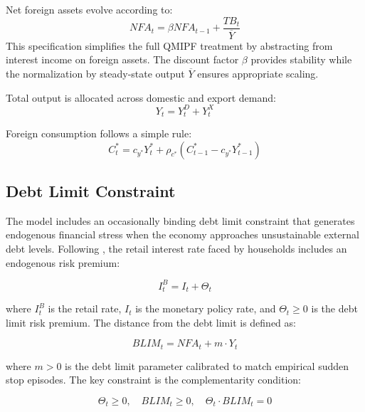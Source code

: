 \documentclass[12pt]{article}
\begin{document}
Net foreign assets evolve according to:
\begin{equation}\label{eq:nfa}
NFA_t = \beta NFA_{t-1} + \frac{TB_t}{\overline{Y}}
\end{equation}
This specification simplifies the full QMIPF treatment by abstracting from interest income on foreign assets. The discount factor $\beta$ provides stability while the normalization by steady-state output $\overline{Y}$ ensures appropriate scaling.

Total output is allocated across domestic and export demand:
\begin{equation}
Y_t = Y_t^D + Y_t^X
\end{equation}

Foreign consumption follows a simple rule:
\begin{equation}
C_t^* = c_{y^*} Y_t^* + \rho_{c^*} (C_{t-1}^* - c_{y^*} Y_{t-1}^*)
\end{equation}

\subsection{Debt Limit Constraint}\label{sec:debt_limit}

The model includes an occasionally binding debt limit constraint that generates endogenous financial stress when the economy approaches unsustainable external debt levels. Following \citet{adrian2021quantitative}, the retail interest rate faced by households includes an endogenous risk premium:

\begin{equation}\label{eq:retail_rate}
I_t^B = I_t + \Theta_t
\end{equation}

where $I_t^B$ is the retail rate, $I_t$ is the monetary policy rate, and $\Theta_t \geq 0$ is the debt limit risk premium. The distance from the debt limit is defined as:

\begin{equation}\label{eq:blim}
BLIM_t = NFA_t + m \cdot Y_t
\end{equation}

where $m > 0$ is the debt limit parameter calibrated to match empirical sudden stop episodes. The key constraint is the complementarity condition:

\begin{equation}\label{eq:complementarity}
\Theta_t \geq 0, \quad BLIM_t \geq 0, \quad \Theta_t \cdot BLIM_t = 0
\end{equation}
\end{document}
